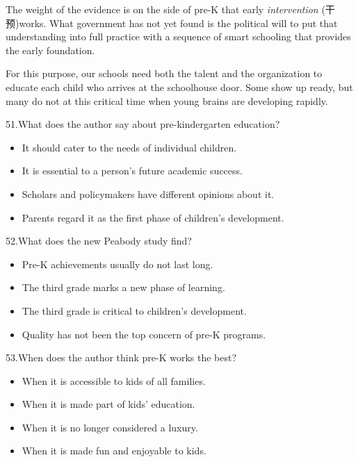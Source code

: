 \documentclass[UTF8,11pt]{ctexart}
\begin{document}
The weight of the evidence is on the side of pre-K that early\textit{ intervention} (干预)works. What government has not yet found is the political will to put that understanding into full practice with a sequence of smart schooling that provides the early foundation.


For this purpose, our schools need both the talent and the organization to educate each child who arrives at the schoolhouse door. Some show up ready, but many do not at this critical time when young brains are developing rapidly.


51.What does the author say about pre-kindergarten education?


\begin{itemize}[leftmargin=2em,itemsep=.2em,topsep=.4em]\item[A.] It should cater to the needs of individual children.
\item[B.] It is essential to a person’s future academic success.
\item[C.] Scholars and policymakers have different opinions about it.
\item[D.] Parents regard it as the first phase of children’s development.
\end{itemize}

52.What does the new Peabody study find?


\begin{itemize}[leftmargin=2em,itemsep=.2em,topsep=.4em]\item[A.] Pre-K achievements usually do not last long.
\item[B.] The third grade marks a new phase of learning.
\item[C.] The third grade is critical to children’s development.
\item[D.] Quality has not been the top concern of pre-K programs.
\end{itemize}

53.When does the author think pre-K works the best?


\begin{itemize}[leftmargin=2em,itemsep=.2em,topsep=.4em]\item[A.] When it is accessible to kids of all families.
\item[B.] When it is made part of kids’ education.
\item[C.] When it is no longer considered a luxury.
\item[D.] When it is made fun and enjoyable to kids.
\end{itemize}
\end{document}
